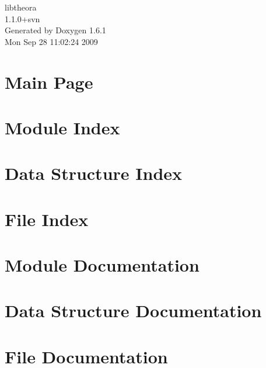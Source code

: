 \documentclass[a4paper]{book}
\begin{document}
\begin{titlepage}
\vspace*{7cm}
\begin{center}
{\Large libtheora \\[1ex]\large 1.1.0+svn }\\
\vspace*{1cm}
{\large Generated by Doxygen 1.6.1}\\
\vspace*{0.5cm}
{\small Mon Sep 28 11:02:24 2009}\\
\end{center}
\end{titlepage}
\clearemptydoublepage
{}
\tableofcontents
\clearemptydoublepage
{}
\chapter{Main Page}
\label{index}
\chapter{Module Index}

\chapter{Data Structure Index}

\chapter{File Index}

\chapter{Module Documentation}




\chapter{Data Structure Documentation}











\chapter{File Documentation}




\printindex
\end{document}
